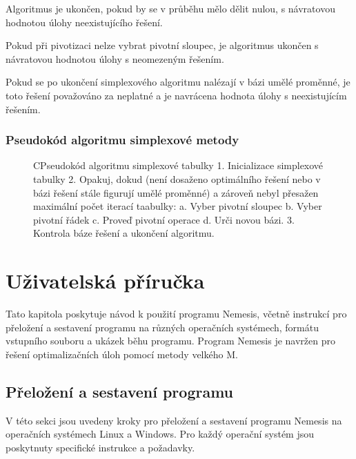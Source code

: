\documentclass[czech, sem, kiv, he, pdf, viewonly]{fasthesis}
\begin{document}
Algoritmus je ukončen, pokud by se v průběhu mělo dělit nulou, s návratovou hodnotou úlohy neexistujícího řešení.

Pokud při pivotizaci nelze vybrat pivotní sloupec, je algoritmus ukončen s návratovou hodnotou úlohy s neomezeným řešením.

Pokud se po ukončení simplexového algoritmu nalézají v bázi umělé proměnné, je toto řešení považováno za neplatné a je navrácena hodnota úlohy s neexistujícím řešením.

\subsection{Pseudokód algoritmu simplexové metody}

\begin{figure}[H]
\begin{code}{C}{Pseudokód algoritmu simplexové tabulky\label{lst:pseudoSimplex}}
1. Inicializace simplexové tabulky
2. Opakuj, dokud (není dosaženo optimálního řešení nebo v bázi řešení stále figurují umělé proměnné) a zároveň nebyl přesažen maximální počet iterací taabulky:
        a. Vyber pivotní sloupec
        b. Vyber pivotní řádek
        c. Proveď pivotní operace
        d. Urči novou bázi.
3. Kontrola báze řešení a ukončení algoritmu.
\end{code}
\end{figure}

%
%
%
%
%
%
\chapter{Uživatelská příručka}
Tato kapitola poskytuje návod k použití programu Nemesis, včetně instrukcí pro přeložení a sestavení programu na různých operačních systémech, formátu vstupního souboru a ukázek běhu programu. Program Nemesis je navržen pro řešení optimalizačních úloh pomocí metody velkého M.

\section{Přeložení a sestavení programu}
V této sekci jsou uvedeny kroky pro přeložení a sestavení programu Nemesis na operačních systémech Linux a Windows. Pro každý operační systém jsou poskytnuty specifické instrukce a požadavky.
\end{document}
